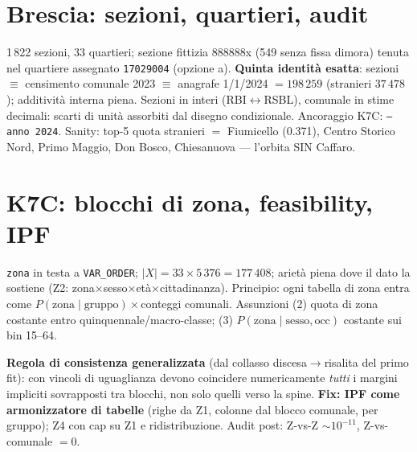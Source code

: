 \documentclass[11pt,a4paper]{article}
\newcommand{\code}[1]{\texttt{#1}}
\begin{document}
\section{Brescia: sezioni, quartieri, audit}
1\,822 sezioni, 33 quartieri; sezione fittizia 888888x (549 senza fissa
dimora) tenuta nel quartiere assegnato \code{17029004} (opzione a).
\textbf{Quinta identit\`a esatta}: sezioni $\equiv$ censimento comunale 2023
$\equiv$ anagrafe 1/1/2024 $= 198\,259$ (stranieri $37\,478$); additivit\`a
interna piena. Sezioni in interi (RBI$\leftrightarrow$RSBL), comunale in
stime decimali: scarti di unit\`a assorbiti dal disegno condizionale.
Ancoraggio K7C: \code{--anno 2024}. Sanity: top-5 quota stranieri $=$
Fiumicello (0.371), Centro Storico Nord, Primo Maggio, Don Bosco,
Chiesanuova --- l'orbita SIN Caffaro.

\section{K7C: blocchi di zona, feasibility, IPF}
\label{sec:k7c}
\code{zona} in testa a \code{VAR\_ORDER}; $|X| = 33\times5\,376 = 177\,408$;
ariet\`a piena dove il dato la sostiene (Z2:
zona$\times$sesso$\times$et\`a$\times$cittadinanza). Principio: ogni tabella
di zona entra come $P(\text{zona}\mid\text{gruppo})\times$conteggi comunali.
Assunzioni (2) quota di zona costante entro quinquennale/macro-classe;
(3) $P(\text{zona}\mid\text{sesso},\text{occ})$ costante sui bin 15--64.

\medskip\noindent\textbf{Regola di consistenza generalizzata} (dal collasso
discesa$\to$risalita del primo fit): con vincoli di uguaglianza devono
coincidere numericamente \emph{tutti} i margini impliciti sovrapposti tra
blocchi, non solo quelli verso la spine. \textbf{Fix: IPF come armonizzatore
di tabelle} (righe da Z1, colonne dal blocco comunale, per gruppo); Z4 con
cap su Z1 e ridistribuzione. Audit post: Z-vs-Z $\sim10^{-11}$,
Z-vs-comunale $=0$.

\end{document}
